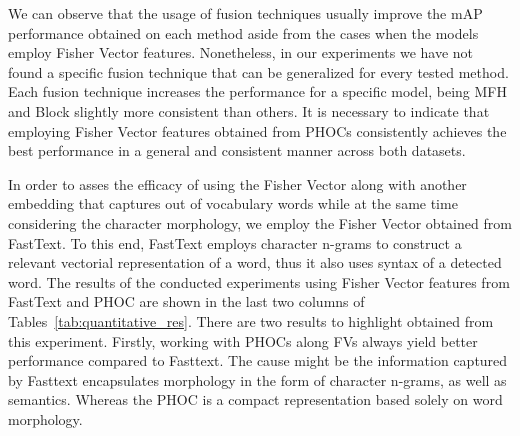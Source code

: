 \documentclass[10pt,twocolumn,letterpaper]{article}
\begin{document}
We can observe that the usage of fusion techniques usually improve the mAP performance obtained on each method aside from the cases when the models employ Fisher Vector features. Nonetheless, in our experiments we have not found a specific fusion technique that can be generalized for every tested method. Each fusion technique increases the performance for a specific model, being MFH and Block slightly more consistent than others. 
It is necessary to indicate that employing Fisher Vector features obtained from PHOCs consistently achieves the best performance in a general and consistent manner across both datasets.

In order to asses the efficacy of using the Fisher Vector along with another embedding that captures out of vocabulary words while at the same time considering the character morphology, we employ the Fisher Vector obtained from FastText. To this end, FastText employs character n-grams to construct a relevant vectorial representation of a word, thus it also uses syntax of a detected word. The results of the conducted experiments using Fisher Vector features from FastText and PHOC are shown in the last two columns of Tables~\ref{tab:quantitative_res}. 
There are two results to highlight obtained from this experiment. Firstly, working with PHOCs along FVs always yield better performance compared to Fasttext. The cause might be the information captured by Fasttext encapsulates morphology in the form of character n-grams, as well as semantics. Whereas the PHOC is a compact representation based solely on word morphology. 
\setlength\tabcolsep{1.2pt}
\end{document}
